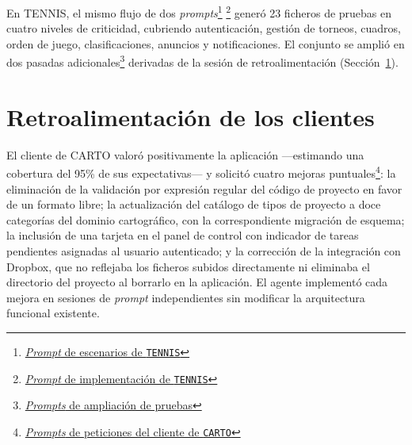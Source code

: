 En \ac{TENNIS}, el mismo flujo de dos \textit{prompts}\footnote{\href{https://github.com/alu0101549491/TFG-Fabian-Gonzalez-Lence/blob/main/resources/prompts/5-TennisTournamentManager/5-TestingDeLaAplicacion/test-scenarios.prompt.md}{\textit{Prompt} de escenarios de \texttt{TENNIS}}} \footnote{\href{https://github.com/alu0101549491/TFG-Fabian-Gonzalez-Lence/blob/main/resources/prompts/5-TennisTournamentManager/5-TestingDeLaAplicacion/test-implementations.prompt.md}{\textit{Prompt} de implementación de \texttt{TENNIS}}} generó 23 ficheros de pruebas en cuatro niveles de criticidad, cubriendo autenticación, gestión de torneos, cuadros, orden de juego, clasificaciones, anuncios y notificaciones. El conjunto se amplió en dos pasadas adicionales\footnote{\href{https://github.com/alu0101549491/TFG-Fabian-Gonzalez-Lence/tree/main/resources/prompts/5-TennisTournamentManager/5-TestingDeLaAplicacion}{\textit{Prompts} de ampliación de pruebas}} derivadas de la sesión de retroalimentación (Sección~\ref{sec:dev-client-feedback}).

\section{Retroalimentación de los clientes} \label{sec:dev-client-feedback}

El cliente de \ac{CARTO} valoró positivamente la aplicación ---estimando una cobertura del 95\% de sus expectativas--- y solicitó cuatro mejoras puntuales\footnote{\href{https://github.com/alu0101549491/TFG-Fabian-Gonzalez-Lence/tree/main/resources/prompts/4-CartographicProjectManager/6-PeticionesDelCliente}{\textit{Prompts} de peticiones del cliente de \texttt{CARTO}}}: la eliminación de la validación por expresión regular del código de proyecto en favor de un formato libre; la actualización del catálogo de tipos de proyecto a doce categorías del dominio cartográfico, con la correspondiente migración de esquema; la inclusión de una tarjeta en el panel de control con indicador de tareas pendientes asignadas al usuario autenticado; y la corrección de la integración con Dropbox, que no reflejaba los ficheros subidos directamente ni eliminaba el directorio del proyecto al borrarlo en la aplicación. El agente implementó cada mejora en sesiones de \textit{prompt} independientes sin modificar la arquitectura funcional existente.\\

